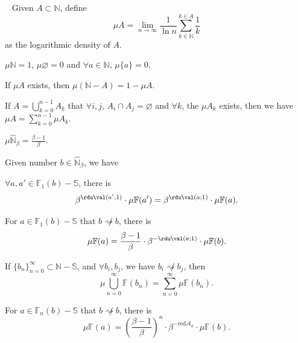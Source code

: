 \begin{definition}~\label{def:logarithmic-density}
	Given $A \subset \mathbb{N}$, define
	\[ \mu A = \lim_{n\to\infty}\frac{1}{\ln n}\sum_{k\in\mathbb{N}}^{k\in A}\frac{1}{k} \]
	as the logarithmic density of $A$.
\end{definition}
\begin{proposition}
	$\mu\mathbb{N} = 1$, $\mu\varnothing = 0$ and $\forall a \in\mathbb{N}$, $\mu\{a\} = 0$.
\end{proposition}
\begin{proposition}
	If $\mu{A}$ exists, then $\mu(\mathbb{N} - A) = 1 - \mu{A}$.
\end{proposition}
\begin{proposition}
	If $A = \bigcup_{k=0}^{n-1}A_{k}$ that $\forall i, j$, $A_{i}\cap A_{j} = \varnothing$ and $\forall k$, the $\mu{A_k}$ exists, then we have $\mu{A} = \sum_{k=0}^{n-1}\mu{A_{k}}$.
\end{proposition}
\begin{proposition}
	$\mu\widehat{\mathbb{N}}_{{\beta}} = \frac{\beta - 1}{\beta}$.
\end{proposition}
Given number $b \in\widehat{\mathbb{N}}_{{\beta}}$, we have
\begin{proposition}
	$\forall a, a' \in \mathbb{F}_{1}(b) - \mathbb{S}$, there is
	\[ \beta^{\rdu\val(a';1)}\cdot\mu\mathbb{F}(a') = \beta^{\rdu\val(a;1)}\cdot\mu\mathbb{F}(a). \]
\end{proposition}
\begin{proposition}
	For $a \in \mathbb{F}_{1}(b) - \mathbb{S}$ that $b \not\rightsquigarrow b$, there is
	\[ \mu\mathbb{F}(a) = \frac{\beta - 1}{\beta}\cdot\beta^{-\rdu\val(a;1)}\cdot\mu\mathbb{F}(b). \]
\end{proposition}
\begin{proposition}
	If $\{b_n\}_{n=0}^{\infty} \subset \mathbb{N} - \mathbb{S}$, and $\forall b_i, b_j$, we have $b_i \not\rightsquigarrow b_j$, then
	\[ \mu\bigcup_{n=0}^{\infty}\mathbb{F}(b_n) = \sum_{n=0}^{\infty}\mu\mathbb{F}(b_n). \]
\end{proposition}
\begin{proposition}
	For $a \in \mathbb{F}_{n}(b) - \mathbb{S}$ that $b \not\rightsquigarrow b$, there is
	\[ \mu\mathbb{F}(a) = \left(\frac{\beta - 1}{\beta}\right)^{n} \cdot \beta^{-\mathrm{red}\mathcal{A}_n}\cdot\mu\mathbb{F}(b). \]
\end{proposition}